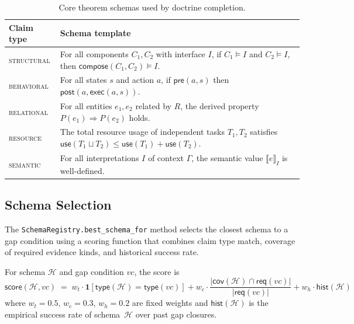 \documentclass[11pt]{article}
\newcommand{\VC}{\mathit{vc}}             %
\newcommand{\Schm}{\mathcal{H}}           %
\begin{document}
\begin{table}[H]
\centering
\caption{Core theorem schemas used by doctrine completion.}
\label{tab:schemas}
\begin{tabular}{lp{9cm}}
\toprule
\textbf{Claim type} & \textbf{Schema template} \\
\midrule
\textsc{structural}
  & For all components $C_1, C_2$ with interface $I$,
    if $C_1 \models I$ and $C_2 \models I$, then
    $\mathsf{compose}(C_1, C_2) \models I$. \\[4pt]
\textsc{behavioral}
  & For all states $s$ and action $a$, if $\mathsf{pre}(a, s)$ then
    $\mathsf{post}(a, \mathsf{exec}(a, s))$. \\[4pt]
\textsc{relational}
  & For all entities $e_1, e_2$ related by $R$, the derived
    property $P(e_1) \Rightarrow P(e_2)$ holds. \\[4pt]
\textsc{resource}
  & The total resource usage of independent tasks $T_1, T_2$ satisfies
    $\mathsf{use}(T_1 \sqcup T_2) \leq \mathsf{use}(T_1) + \mathsf{use}(T_2)$. \\[4pt]
\textsc{semantic}
  & For all interpretations $I$ of context $\Gamma$, the semantic
    value $\llbracket e \rrbracket_I$ is well-defined. \\
\bottomrule
\end{tabular}
\end{table}

\subsection{Schema Selection}

The \texttt{SchemaRegistry.best\_schema\_for} method selects the
closest schema to a gap condition using a scoring function that combines
claim type match, coverage of required evidence kinds, and historical
success rate.

\begin{definition}\label{def:schema-score}
For schema $\Schm$ and gap condition $\VC$, the score is
\[
  \mathsf{score}(\Schm, \VC)
  \;=\;
  w_t \cdot \mathbf{1}[\mathsf{type}(\Schm) = \mathsf{type}(\VC)]
  + w_c \cdot \frac{|\mathsf{cov}(\Schm) \cap \mathsf{req}(\VC)|}{|\mathsf{req}(\VC)|}
  + w_h \cdot \mathsf{hist}(\Schm)
\]
where $w_t = 0.5$, $w_c = 0.3$, $w_h = 0.2$ are fixed weights and
$\mathsf{hist}(\Schm)$ is the empirical success rate of schema~$\Schm$
over past gap closures.
\end{definition}

\end{document}
